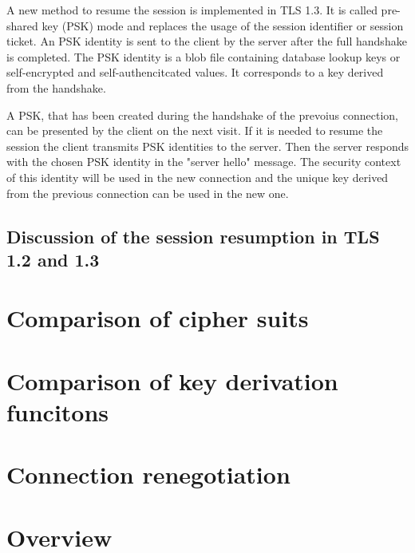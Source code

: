 A new method to resume the session is implemented in TLS 1.3. It is called pre-shared key (PSK) mode and replaces the usage of the session identifier or session ticket. An PSK identity is sent to the client by the server after the full handshake is completed. The PSK identity is a blob file containing database lookup keys or self-encrypted and self-authencitcated values. It corresponds to a key derived from the handshake.

A PSK, that has been created during the handshake of the prevoius connection, can be presented by the client on the next visit. If it is needed to resume the session the client transmits PSK identities to the server. Then the server responds with the chosen PSK identity in the "server hello" message. The security context of this identity will be used in the new connection and the unique key derived from the previous connection can be used in the new one.

\subsection{Discussion of the session resumption in TLS 1.2 and 1.3}
\label{subsec:discussion_resumption}

\section{Comparison of cipher suits}
\label{sec:comparison_ciphersuits}

\section{Comparison of key derivation funcitons}
\label{sec:comparison_kdf}

\section{Connection renegotiation}
\label{sec:comparison_renegotiation}

\section{Overview}
\label{sec:overview}

